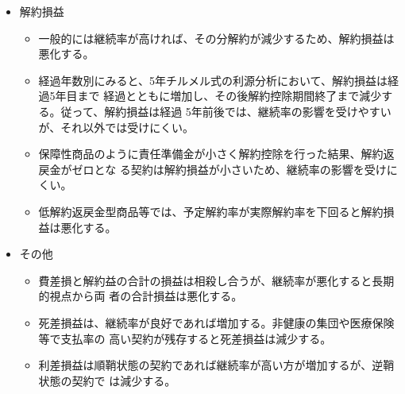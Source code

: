 \documentclass[report,gutter=10mm,fore-edge=10mm,uplatex,dvipdfmx]{jlreq}
\begin{document}
\begin{itemize}
\begin{itemize}
\begin{itemize}
\end{itemize}
\item[] 解約損益
\begin{itemize}
\item[] 一般的には継続率が高ければ、その分解約が減少するため、解約損益は悪化する。
\item[] 経過年数別にみると、5年チルメル式の利源分析において、解約損益は経過5年目まで
経過とともに増加し、その後解約控除期間終了まで減少する。従って、解約損益は経過
5年前後では、継続率の影響を受けやすいが、それ以外では受けにくい。
\item[] 保障性商品のように責任準備金が小さく解約控除を行った結果、解約返戻金がゼロとな
る契約は解約損益が小さいため、継続率の影響を受けにくい。
\item[] 低解約返戻金型商品等では、予定解約率が実際解約率を下回ると解約損益は悪化する。
\end{itemize}
\item[] その他
\begin{itemize}
\item[] 費差損と解約益の合計の損益は相殺し合うが、継続率が悪化すると長期的視点から両
者の合計損益は悪化する。
\item[] 死差損益は、継続率が良好であれば増加する。非健康の集団や医療保険等で支払率の
高い契約が残存すると死差損益は減少する。
\item[] 利差損益は順鞘状態の契約であれば継続率が高い方が増加するが、逆鞘状態の契約で
は減少する。
\end{itemize}
\end{itemize}
\end{itemize}
\end{document}
